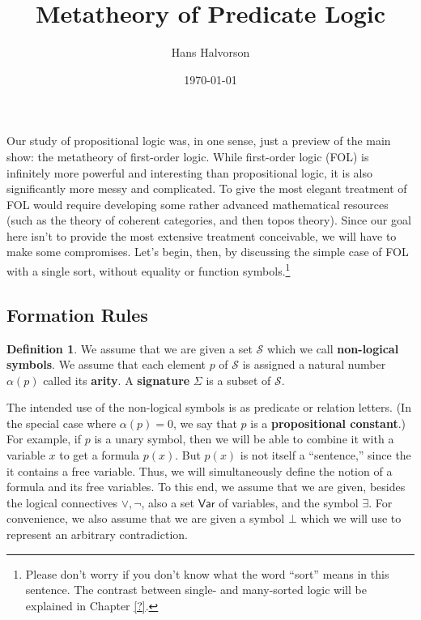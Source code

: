 \documentclass[10pt,fleqn]{article}
\title{Metatheory of Predicate Logic}
\author{Hans Halvorson}
\date{\today}
\theoremstyle{definition}
\newtheorem*{defn}{Definition}
\theoremstyle{remark}
\newcommand{\2}{\mathscr}
\renewcommand{\emph}{\textbf}
\begin{document}
\maketitle

Our study of propositional logic was, in one sense, just a preview of
the main show: the metatheory of first-order logic.  While first-order
logic (FOL) is infinitely more powerful and interesting than
propositional logic, it is also significantly more messy and
complicated.  To give the most elegant treatment of FOL would require
developing some rather advanced mathematical resources (such as the
theory of coherent categories, and then topos theory).  Since our goal
here isn't to provide the most extensive treatment conceivable, we
will have to make some compromises.  Let's begin, then, by discussing
the simple case of FOL with a single sort, without equality or
function symbols.\footnote{Please don't worry if you don't know what
  the word ``sort'' means in this sentence.  The contrast between
  single- and many-sorted logic will be explained in Chapter \ref{?}.}

\subsection*{Formation Rules}




\begin{defn} We assume that we are given a set $\2S$ which we call
  \emph{non-logical symbols}.  We assume that each element $p$ of
  $\2S$ is assigned a natural number $\alpha (p)$ called its
  \emph{arity}.  A \emph{signature} $\Sigma$ is a subset of
  $\2S$. \end{defn}

The intended use of the non-logical symbols is as predicate or
relation letters.  (In the special case where $\alpha (p)=0$, we say
that $p$ is a \emph{propositional constant}.)  For example, if $p$ is
a unary symbol, then we will be able to combine it with a variable $x$
to get a formula $p(x)$.  But $p(x)$ is not itself a ``sentence,''
since the it contains a free variable.  Thus, we will simultaneously
define the notion of a formula and its free variables.  To this end,
we assume that we are given, besides the logical connectives $\vee
,\neg$, also a set $\mathsf{Var}$ of variables, and the symbol
$\exists$.  For convenience, we also assume that we are given a symbol
$\bot$ which we will use to represent an arbitrary contradiction.
\end{document}
